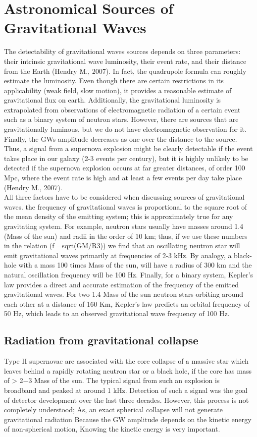 \documentclass[11]{article}
\begin{document}
\section{Astronomical Sources of Gravitational Waves}
The detectability of gravitational waves sources depends on three parameters: their intrinsic gravitational wave luminosity, their event rate, and their distance from the Earth (Hendry M., 2007). In fact, the quadrupole formula can roughly estimate the luminosity. Even though there are certain restrictions in its applicability (weak field, slow motion), it provides a reasonable estimate of gravitational flux on earth. Additionally, the gravitational luminosity is extrapolated from observations of electromagnetic radiation of a certain event such as a binary system of neutron stars. However, there are sources that are gravitationally luminous, but we do not have electromagnetic observation for it. Finally, the GWs amplitude decreases as one over the distance to the source. Thus, a signal from a supernova explosion might be clearly detectable if the event takes place in our galaxy (2-3 events per century), but it is highly unlikely to be detected if the supernova explosion occurs at far greater distances, of order 100 Mpc, where the event rate is high and at least a few events per day take place (Hendry M., 2007).\\
All three factors have to be considered when discussing sources of gravitational waves. the frequency of gravitational waves is proportional to the square root of the mean density of the emitting system; this is approximately true for any gravitating system. For example, neutron stars usually have masses around 1.4 (Mass of the sun) and radii in the order of 10 km; thus, if we use these numbers in the relation (f =sqrt(GM/R3)) we find that an oscillating neutron star will emit gravitational waves primarily at frequencies of 2-3 kHz. By analogy, a black-hole with a mass 100 times Mass of the sun, will have a radius of 300 km and the natural oscillation frequency will be 100 Hz. Finally, for a binary system, Kepler’s law provides a direct and accurate estimation of the frequency of the emitted gravitational waves. For two 1.4 Mass of the sun neutron stars orbiting around each other at a distance of 160 Km, Kepler’s law predicts an orbital frequency of 50 Hz, which leads to an observed gravitational wave frequency of 100 Hz.

\subsection{Radiation from gravitational collapse}
Type II supernovae are associated with the core collapse of a massive star which leaves behind a rapidly rotating neutron star or a black hole, if the core has mass of > 2−3 Mass of the sun. The typical signal from such an explosion is broadband and peaked at around 1 kHz. Detection of such a signal was the goal of detector development over the last three decades. However, this process is not completely understood; As, an exact spherical collapse will not generate gravitational radiation Because the GW amplitude depends on the kinetic energy of non-spherical motion, Knowing the kinetic energy is very important.
\end{document}
